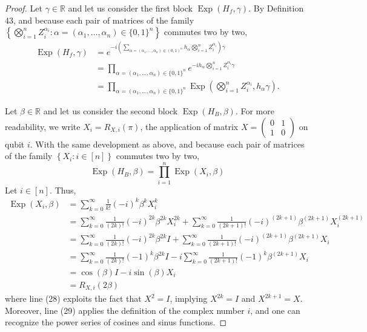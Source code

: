 \begin{proof}
Let $\gamma \in \mathbb{R}$ and let us consider the first block $\operatorname{Exp}\left(H_{f}, \gamma\right)$. By Definition 43, and because each pair of matrices of the family $\left\{\bigotimes_{i=1}^{n} Z_{i}^{\alpha_{i}}: \alpha=\left(\alpha_{1}, \ldots, \alpha_{n}\right) \in\{0,1\}^{n}\right\}$ commutes two by two, %
\begin{align}
\operatorname{Exp}\left(H_{f}, \gamma\right) & =e^{-i\left(\sum_{\alpha=\left(\alpha_{1}, \ldots, \alpha_{n}\right) \in(0,1)^{n}} h_{\alpha} \bigotimes_{i=1}^{n} Z_{i}^{\alpha_{i}}\right) \gamma}  \tag{23}\\
& =\prod_{\alpha=\left(\alpha_{1}, \ldots, \alpha_{n}\right) \in\{0,1\}^{n}} e^{-i h_{\alpha} \bigotimes_{i=1}^{n} Z_{i}^{\alpha_{i}} \gamma}  \tag{24}\\
& =\prod_{\alpha=\left(\alpha_{1}, \ldots, \alpha_{n}\right) \in\{0,1\}^{n}} \operatorname{Exp}\left(\bigotimes_{i=1}^{n} Z_{i}^{\alpha_{i}}, h_{\alpha} \gamma\right). \tag{25}
\end{align}

Let $\beta \in \mathbb{R}$ and let us consider the second block $\operatorname{Exp}\left(H_{B}, \beta\right)$. For more readability, we write $X_{i}=R_{X, i}(\pi)$, the application of matrix $X=\left(\begin{array}{ll}0 & 1 \\ 1 & 0\end{array}\right)$ on qubit $i$. With the same development as above, and because each pair of matrices of the family $\left\{X_{i}: i \in[n]\right\}$ commutes two by two,
\begin{equation}
    \operatorname{Exp}\left(H_{B}, \beta\right)=\prod_{i=1}^{n} \operatorname{Exp}\left(X_{i}, \beta\right)
\end{equation}
Let $i \in[n]$. Thus,
\begin{align}
\operatorname{Exp}\left(X_{i}, \beta\right) & =\sum_{k=0}^{\infty} \frac{1}{k!}(-i)^{k} \beta^{k} X_{i}^{k}  \tag{26}\\
& =\sum_{k=0}^{\infty} \frac{1}{(2 k)!}(-i)^{2 k} \beta^{2 k} X_{i}^{2 k}+\sum_{k=0}^{\infty} \frac{1}{(2 k+1)!}(-i)^{(2 k+1)} \beta^{(2 k+1)} X_{i}^{(2 k+1)} \tag{27} \\
& =\sum_{k=0}^{\infty} \frac{1}{(2 k)!}(-i)^{2 k} \beta^{2 k} I+\sum_{k=0}^{\infty} \frac{1}{(2 k+1)!}(-i)^{(2 k+1)} \beta^{(2 k+1)} X_{i}  \tag{28}\\
& =\sum_{k=0}^{\infty} \frac{1}{(2 k)!}(-1)^{k} \beta^{2 k} I-i \sum_{k=0}^{\infty} \frac{1}{(2 k+1)!}(-1)^{k} \beta^{(2 k+1)} X_{i}  \tag{29}\\
& =\cos (\beta) I-i \sin (\beta) X_{i}  \tag{30}\\
& =R_{X, i}(2 \beta) \tag{31}
\end{align}
where line (28) exploits the fact that $X^{2}=I$, implying $X^{2 k}=I$ and $X^{2 k+1}=X$. Moreover, line (29) applies the definition of the complex number $i$, and one can recognize the power series of cosines and sinus functions.
\end{proof}

